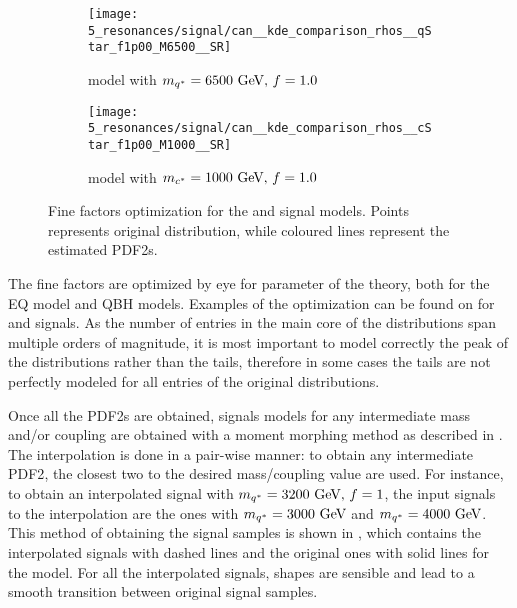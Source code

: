 \begin{figure}[ht!]
    \centering
    \begin{subfigure}[h]{0.49\linewidth}
        \centering
        \texttt{[image: 5\_resonances/signal/can\_\_kde\_comparison\_rhos\_\_qStar\_f1p00\_M6500\_\_SR]}
        \caption{\qstar model with \(m_{q^*} = 6500~\text{GeV},\, f=1.0\)}
        \label{fig:signals:modeling:fine_factor_optimization_qstar}
    \end{subfigure}
    \begin{subfigure}[h]{0.49\linewidth}
        \centering
        \texttt{[image: 5\_resonances/signal/can\_\_kde\_comparison\_rhos\_\_cStar\_f1p00\_M1000\_\_SR]}
        \caption{\cstar model with \(m_{c^*} = 1000~\text{GeV},\, f=1.0\)}
        \label{fig:signals:modeling:fine_factor_optimization_cstar}
    \end{subfigure}
    \caption{Fine factors optimization for the \qstar and \cstar signal models. Points represents original distribution, while coloured lines represent the estimated \acp{PDF2}.}
    \label{fig:signals:modeling:fine_factor_optimization}
\end{figure}

The fine factors are optimized by eye for parameter of the theory, both for the \ac{EQ} model and \ac{QBH} models. Examples of the optimization can be found on \Fig{\ref{fig:signals:modeling:fine_factor_optimization}} for \qstar and \cstar signals. As the number of entries in the main core of the distributions span multiple orders of magnitude, it is most important to model correctly the peak of the distributions rather than the tails, therefore in some cases the tails are not perfectly modeled for all entries of the original distributions.

Once all the \acp{PDF2} are obtained, signals models for any intermediate mass and/or coupling are obtained with a moment morphing method as described in . The interpolation is done in a pair-wise manner: to obtain any intermediate \ac{PDF2}, the closest two to the desired mass/coupling value are used. For instance, to obtain an interpolated signal with \(m_{q^*} = 3200~\text{GeV}, \, f=1\), the input signals to the interpolation are the ones with \(m_{q^*} = 3000~\text{GeV}\) and \(m_{q^*} = 4000~\text{GeV}\).
This method of obtaining the signal samples is shown in \Fig{\ref{fig:signals:modeling:final_interpolation}}, which contains the interpolated signals with dashed lines and the original ones with solid lines for the \qstar model. For all the interpolated signals, shapes are sensible and lead to a smooth transition between original signal samples.


